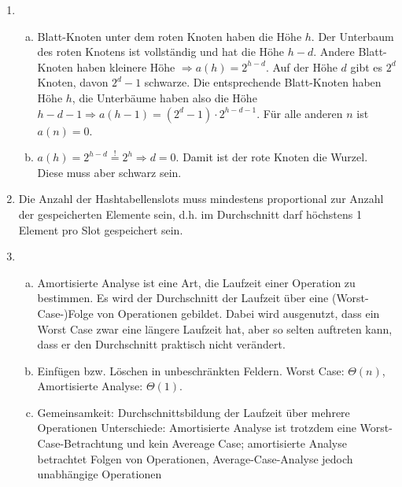 \documentclass{scrartcl}
\begin{document}
\begin{enumerate}[(1)]
\item \begin{enumerate}[(a)]
\item Blatt-Knoten unter dem roten Knoten haben die H\"ohe $h$. Der Unterbaum des roten Knotens ist vollst\"andig und hat die H\"ohe $h-d$. Andere Blatt-Knoten haben kleinere H\"ohe $\Rightarrow a(h)=2^{h-d}$.\newline
Auf der H\"ohe $d$ gibt es $2^d$ Knoten, davon $2^d-1$ schwarze. Die entsprechende Blatt-Knoten haben H\"ohe $h$, die Unterb\"aume haben also die H\"ohe $h-d-1 \Rightarrow a(h-1)=(2^d-1)\cdot 2^{h-d-1}$.\newline
F\"ur alle anderen $n$ ist $a(n) =0$.
\item $a(h)=2^{h-d}\stackrel{!}{=}2^h\Rightarrow d=0$. Damit ist der rote Knoten die Wurzel. Diese muss aber schwarz sein.
\end{enumerate}

\item Die Anzahl der Hashtabellenslots muss mindestens proportional zur Anzahl der gespeicherten Elemente sein, d.h. im Durchschnitt darf höchstens 1 Element pro Slot gespeichert sein.

\item \begin{enumerate}[(a)]
\item Amortisierte Analyse ist eine Art, die Laufzeit einer Operation zu bestimmen. Es wird der Durchschnitt der Laufzeit über eine (Worst-Case-)Folge von Operationen gebildet. Dabei wird ausgenutzt, dass ein Worst Case zwar eine längere Laufzeit hat, aber so selten auftreten kann, dass er den Durchschnitt praktisch nicht verändert.
\item Einfügen bzw. Löschen in unbeschränkten Feldern. Worst Case: $\Theta(n)$, Amortisierte Analyse: $\Theta(1)$.
\item Gemeinsamkeit: Durchschnittsbildung der Laufzeit über mehrere Operationen\newline
Unterschiede: Amortisierte Analyse ist trotzdem eine Worst-Case-Betrachtung und kein Avereage Case; amortisierte Analyse betrachtet Folgen von Operationen, Average-Case-Analyse jedoch unabhängige Operationen
\end{enumerate}
\end{enumerate}
\end{document}
